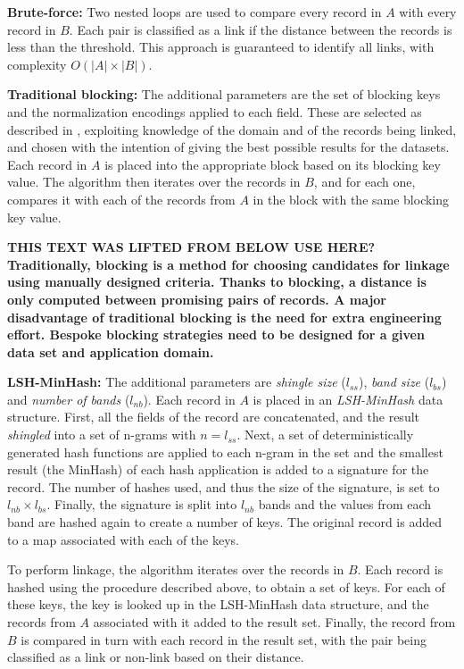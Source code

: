 \documentclass{llncs}
\begin{document}
\textbf{Brute-force:}
Two nested loops are used to compare every record in $A$ with every
record in $B$. Each pair is classified as a link if the distance between
the records is less than the threshold. This approach is guaranteed to
identify all links, with complexity $ O(|A| \times |B|) $.

\textbf{Traditional  blocking:}
The additional parameters are the set of blocking keys and the
normalization encodings applied to each field. These are selected as
described in \cite{Chr12b}, exploiting knowledge of the domain and of
the records being linked, and chosen with the intention of giving the
best possible results for the datasets.
Each record in $A$ is placed into the appropriate block based on its
blocking key value. The algorithm then iterates over the records in $B$,
and for each one, compares it with each of the records from $A$ in the
block with the same blocking key value.

\textbf{THIS TEXT WAS LIFTED FROM BELOW USE HERE? Traditionally, blocking is a method for choosing candidates for linkage using manually designed criteria.
Thanks to blocking, a distance is only computed between promising pairs of records.
A major disadvantage of traditional blocking is the need for extra engineering effort.
Bespoke blocking strategies need to be designed for a given data set and application domain.}

\textbf{LSH-MinHash:}
The additional parameters are \emph{shingle size} ($l_{ss}$), \emph{band
size} ($l_{bs}$) and \emph{number of bands} ($l_{nb}$). Each record in
$A$ is placed in an \emph{LSH-MinHash} data structure. First, all the
fields of the record are concatenated, and the result \emph{shingled}
into a set of n-grams with $n = l_{ss}$. Next, a set of 
deterministically generated hash functions are applied to
each n-gram in the set
and the smallest result (the MinHash) of each hash application is added
to a signature for the record. The number of hashes used, and thus the
size of the signature, is set to $l_{nb} \times l_{bs}$. Finally, the
signature is split into $l_{nb}$ bands and the values from each band
are hashed again to create a number of keys. The original record is
added to a map associated with each of the keys. 

To perform linkage, the algorithm iterates over the records in $B$. Each
record is hashed using the procedure described above, to obtain a set of
keys. For each of these keys, the key is looked up in the LSH-MinHash
data structure, and the records from $A$ associated with it added to the
result set. Finally, the record from $B$ is compared in turn with each
record in the result set, with the pair being classified as a link or
non-link based on their distance.
\end{document}
